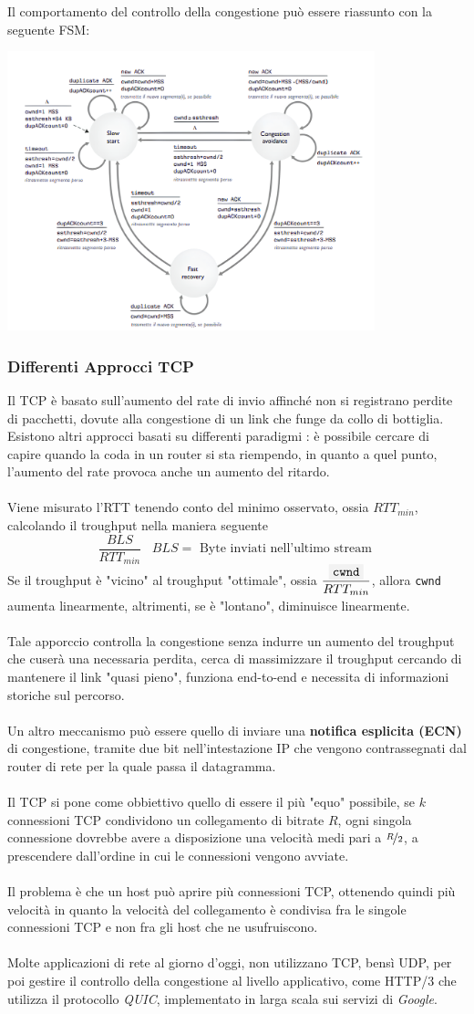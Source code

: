 \documentclass[12pt, letterpaper]{article}
\newcommand{\code}[1]{\colorbox{light-gray}{\texttt{#1}}}
\newcommand{\acc}{\\\hphantom{}\\}
\begin{document}
Il comportamento del controllo della congestione può essere riassunto con la seguente FSM:
\begin{center}
    \includegraphics[width=0.8\textwidth ]{images/TCPfsm.png}
\end{center}
\subsubsection{Differenti Approcci TCP}
Il TCP è basato sull'aumento del rate di invio affinché non si registrano
perdite di pacchetti, dovute alla congestione di un link che funge
da collo di bottiglia. Esistono altri approcci basati su differenti
paradigmi : è possibile cercare di capire quando la coda in un router
si sta riempendo, in quanto a quel punto,
l'aumento del rate provoca anche un aumento del ritardo.\acc 
Viene misurato l'RTT tenendo conto del minimo osservato, ossia $RTT_{min}$, calcolando il troughput nella maniera 
seguente $$ \dfrac{BLS}{RTT_{min}}\;\;\;BLS = \text{ Byte inviati nell'ultimo stream }$$
Se il troughput è "vicino" al troughput "ottimale", ossia $\dfrac{\code{cwnd}}{RTT_{min}}$, allora  \code{cwnd} 
aumenta linearmente, altrimenti, se è "lontano", diminuisce linearmente.\acc 
Tale apporccio controlla la congestione senza indurre un aumento del troughput che cuserà una necessaria perdita, cerca 
di massimizzare il troughput cercando di mantenere il link "quasi pieno", funziona end-to-end e necessita di informazioni 
storiche sul percorso.\acc 
Un altro meccanismo può essere quello di inviare una \textbf{notifica esplicita (ECN)} di congestione, tramite 
due bit nell'intestazione IP che vengono contrassegnati dal router di rete per la quale passa il datagramma.\acc 
Il TCP si pone come obbiettivo quello di essere il più "equo" possibile, se $k$ connessioni TCP condividono 
un collegamento di bitrate $R$, ogni singola connessione dovrebbe avere a disposizione una velocità 
medi pari a $\nicefrac{R}{2}$, a prescendere dall'ordine in cui le connessioni vengono avviate.\acc 
Il problema è che un host può aprire più connessioni TCP, ottenendo quindi più velocità in quanto la velocità del 
collegamento è condivisa fra le singole connessioni TCP e non fra gli host che ne usufruiscono.\acc 
Molte applicazioni di rete al giorno d'oggi, non utilizzano TCP, bensì UDP, per poi gestire il controllo della 
congestione al livello applicativo, come HTTP/3 che utilizza il protocollo \textit{QUIC}, implementato in larga scala 
sui servizi di \textit{Google}.
\end{document}
